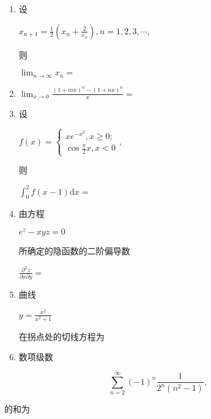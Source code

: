 \documentclass[10pt]{article}
\begin{document}
\begin{enumerate}
  \item \begin{CJK}{UTF8}{mj}设\end{CJK} $x_{n+1}=\frac{1}{2}\left(x_{n}+\frac{2}{x_{n}}\right), n=1,2,3, \cdots$, \begin{CJK}{UTF8}{mj}则\end{CJK} $\lim _{n \rightarrow \infty} x_{n}=$

  \item $\lim _{x \rightarrow 0} \frac{(1+m x)^{n}-(1+n x)^{n}}{x}=$

  \item \begin{CJK}{UTF8}{mj}设\end{CJK} $f(x)=\left\{\begin{array}{l}x e^{-x^{2}}, x \geqslant 0 ; \\ \cos \frac{\pi}{2} x, x<0\end{array}\right.$, \begin{CJK}{UTF8}{mj}则\end{CJK} $\int_{0}^{2} f(x-1) \mathrm{d} x=$

  \item \begin{CJK}{UTF8}{mj}由方程\end{CJK} $e^{z}-x y z=0$ \begin{CJK}{UTF8}{mj}所确定的隐函数的二阶偏导数\end{CJK} $\frac{\partial^{2} z}{\partial x \partial y}=$

  \item \begin{CJK}{UTF8}{mj}曲线\end{CJK} $y=\frac{x^{2}}{x^{2}+1}$ \begin{CJK}{UTF8}{mj}在拐点处的切线方程为\end{CJK}

  \item \begin{CJK}{UTF8}{mj}数项级数\end{CJK}

\end{enumerate}
$$
\sum_{n=2}^{\infty}(-1)^{n} \frac{1}{2^{n}\left(n^{2}-1\right)},
$$
\begin{CJK}{UTF8}{mj}的和为\end{CJK}
\end{document}
